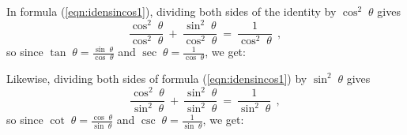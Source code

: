 In formula (\ref{eqn:idensincos1}), dividing both sides of the identity by $\cos^2 \;\theta$ gives
\begin{displaymath}
 \frac{\cos^2 \;\theta}{\cos^2 \;\theta} ~+~ \frac{\sin^2 \;\theta}{\cos^2 \;\theta} ~=~
  \frac{1}{\cos^2 \;\theta} ~~,
\end{displaymath}
so since $\tan\;\theta = \frac{\sin\;\theta}{\cos\;\theta}$ and $\sec\;\theta =
\frac{1}{\cos\;\theta}$, we get:
\begin{center}\end{center}
Likewise, dividing both sides of formula (\ref{eqn:idensincos1}) by $\sin^2 \;\theta$ gives
\begin{displaymath}
 \frac{\cos^2 \;\theta}{\sin^2 \;\theta} ~+~ \frac{\sin^2 \;\theta}{\sin^2 \;\theta} ~=~
 \frac{1}{\sin^2 \;\theta} ~~,
\end{displaymath}
so since $\cot\;\theta = \frac{\cos\;\theta}{\sin\;\theta}$ and $\csc\;\theta =
\frac{1}{\sin\;\theta}$, we get:
\begin{center}\end{center}

